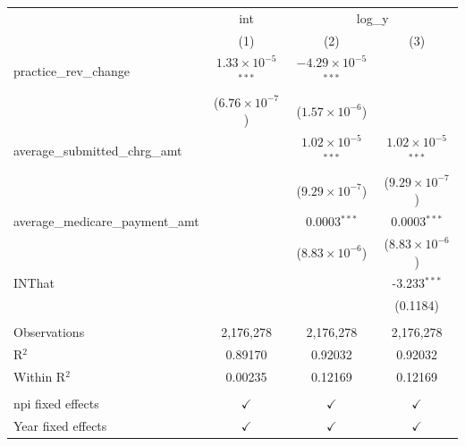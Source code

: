 \documentclass[
  12pt,
]{article}
\begin{document}
\begingroup
\centering
\begin{tabular}{lccc}
   \toprule
    & int & \multicolumn{2}{c}{log\_y}\\
                                      & (1)                           & (2)                            & (3)\\  
   \midrule 
   practice\_rev\_change              & $1.33\times 10^{-5}$$^{***}$  & $-4.29\times 10^{-5}$$^{***}$  &   \\   
                                      & ($6.76\times 10^{-7}$)        & ($1.57\times 10^{-6}$)         &   \\   
   average\_submitted\_chrg\_amt      &                               & $1.02\times 10^{-5}$$^{***}$   & $1.02\times 10^{-5}$$^{***}$\\    
                                      &                               & ($9.29\times 10^{-7}$)         & ($9.29\times 10^{-7}$)\\    
   average\_medicare\_payment\_amt    &                               & 0.0003$^{***}$                 & 0.0003$^{***}$\\   
                                      &                               & ($8.83\times 10^{-6}$)         & ($8.83\times 10^{-6}$)\\    
   INThat                             &                               &                                & -3.233$^{***}$\\   
                                      &                               &                                & (0.1184)\\   
    \\
   Observations                       & 2,176,278                     & 2,176,278                      & 2,176,278\\  
   R$^2$                              & 0.89170                       & 0.92032                        & 0.92032\\  
   Within R$^2$                       & 0.00235                       & 0.12169                        & 0.12169\\  
    \\
   npi fixed effects                  & $\checkmark$                  & $\checkmark$                   & $\checkmark$\\   
   Year fixed effects                 & $\checkmark$                  & $\checkmark$                   & $\checkmark$\\   
   \bottomrule
\end{tabular}
\par\endgroup
\end{document}
